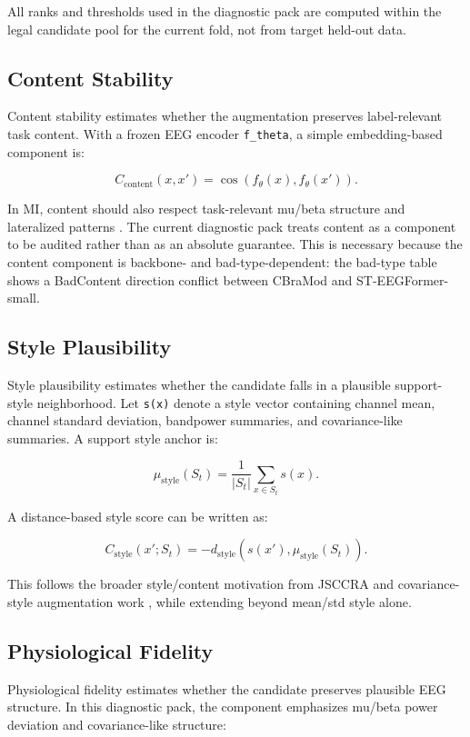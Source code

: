 \documentclass[11pt]{article}
\begin{document}
All ranks and thresholds used in the diagnostic pack are computed within the legal candidate pool for the current fold, not from target held-out data.

\subsection{Content Stability}

Content stability estimates whether the augmentation preserves label-relevant task content. With a frozen EEG encoder \texttt{f\_theta}, a simple embedding-based component is:

\[
C_{\mathrm{content}}(x,x') =
\cos\left(f_{\theta}(x), f_{\theta}(x')\right).
\]

In MI, content should also respect task-relevant mu/beta structure and lateralized patterns \cite{Li2025FrequencyTemporalMI}. The current diagnostic pack treats content as a component to be audited rather than as an absolute guarantee. This is necessary because the content component is backbone- and bad-type-dependent: the bad-type table shows a BadContent direction conflict between CBraMod and ST-EEGFormer-small.

\subsection{Style Plausibility}

Style plausibility estimates whether the candidate falls in a plausible support-style neighborhood. Let \texttt{s(x)} denote a style vector containing channel mean, channel standard deviation, bandpower summaries, and covariance-like summaries. A support style anchor is:

\[
\mu_{\mathrm{style}}(S_t)=\frac{1}{|S_t|}\sum_{x\in S_t}s(x).
\]

A distance-based style score can be written as:

\[
C_{\mathrm{style}}(x';S_t)=
-d_{\mathrm{style}}\left(s(x'),\mu_{\mathrm{style}}(S_t)\right).
\]

This follows the broader style/content motivation from JSCCRA \cite{Ding2026JSCCRA} and covariance-style augmentation work \cite{Ding2025RCC}, while extending beyond mean/std style alone.

\subsection{Physiological Fidelity}

Physiological fidelity estimates whether the candidate preserves plausible EEG structure. In this diagnostic pack, the component emphasizes mu/beta power deviation and covariance-like structure:
\end{document}
